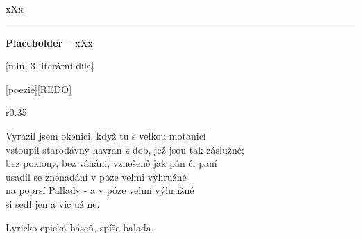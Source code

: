 \documentclass{extarticle} %
\begin{document}





\noindent 
xXx

\vfill

\noindent\begin{minipage}{\textwidth}
    {\textcolor{\wpagecolor}{\rule{\linewidth}{0.4pt}}
    \footnotesize
    \textbf{Placeholder --} xXx
    }
\end{minipage}


\newpage

[min. 3 literární díla]


\changefontsize{7pt}

[poezie][REDO]

\noindent\begin{wrapfigure}{r}{0.35\textwidth}
\tiny

\setlength{\parindent}{3pt}
\begin{center}
\noindent
Vyrazil jsem okenici, když tu s velkou motanicí \\
vstoupil starodávný havran z dob, jež jsou tak záslužné; \\
bez poklony, bez váhání, vznešeně jak pán či paní \\
usadil se znenadání v póze velmi výhružné \\
na poprsí Pallady - a v póze velmi výhružné \\
si sedl jen a víc už ne. 
\end{center}
\end{wrapfigure}


\noindent 
Lyricko-epická báseň, spíše balada.



\end{document}
